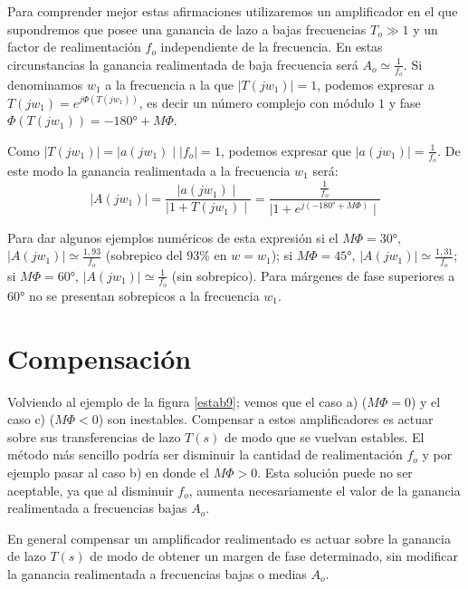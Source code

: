 Para comprender mejor estas afirmaciones utilizaremos un
amplificador en el que supondremos que posee una ganancia de lazo a
bajas frecuencias $T_o\gg1$  y un factor de realimentación $f_o$
independiente de la frecuencia. En estas circunstancias la ganancia
realimentada de baja frecuencia será $A_o \simeq \frac{\displaystyle
	1}{\displaystyle f_o}$. Si denominamos $w_1$ a la frecuencia a la
que $\mid T(jw_1) \mid=1$, podemos expresar a  $T(jw_1)=e^{j
	\Phi(T(jw_1))}$, es decir un número complejo con módulo $1$ y fase
$\Phi(T(jw_1))=-180°+M\Phi$.

Como $\mid T(jw_1) \mid=\mid a(jw_1) \mid \mid f_o \mid = 1$,
podemos expresar que $\mid a(jw_1) \mid = \frac{\displaystyle
	1}{\displaystyle f_o}$. De este modo la ganancia realimentada a la
frecuencia $w_1$ será:
	\begin{equation}
		\nonumber
		\mid A(jw_1) \mid = \frac{\displaystyle \mid a(jw_1) \mid}{\displaystyle \mid 1 + T(jw_1) \mid} = \frac{\displaystyle \frac{\displaystyle 1}{\displaystyle f_o}}{\displaystyle \mid 1 + e^{j(-180°+M\Phi)} \mid}
	\end{equation}

Para dar algunos ejemplos  numéricos de esta expresión si el
$M\Phi=30°$, $\mid A(jw_1) \mid \simeq \frac{\displaystyle
	1,93}{\displaystyle f_o}$ (sobrepico del 93\% en $w=w_1$); si
$M\Phi=45°$, $\mid A(jw_1) \mid \simeq \frac{\displaystyle
	1,31}{\displaystyle f_o}$; si $M\Phi=60°$, $\mid A(jw_1) \mid \simeq
\frac{\displaystyle 1}{\displaystyle f_o}$ (sin sobrepico). Para
márgenes de fase superiores a $60°$ no se presentan sobrepicos a la
frecuencia $w_1$.

\section{Compensación}

\hspace{10pt} Volviendo al ejemplo de la figura \ref{estab9}; vemos que el caso a)
($M\Phi=0$) y el caso c) ($M\Phi<0$) son inestables. Compensar a
estos amplificadores es actuar sobre sus transferencias de lazo
$T(s)$ de modo que se vuelvan estables. El método más sencillo
podría ser disminuir la cantidad de realimentación $f_o$ y por
ejemplo pasar al caso b) en donde el $M\Phi>0$. Esta solución puede
no ser aceptable, ya que al disminuir $f_o$, aumenta necesariamente
el valor de la ganancia realimentada a frecuencias bajas $A_o$.

En general compensar un amplificador realimentado es actuar sobre la
ganancia de lazo $T(s)$ de modo de obtener un margen de fase
determinado, sin modificar la ganancia realimentada a frecuencias
bajas o medias $A_o$.

